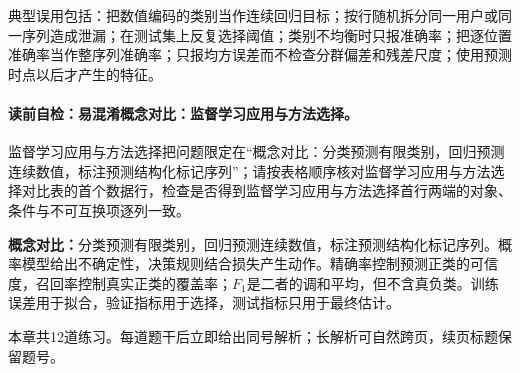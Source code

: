\begin{warningbox}
典型误用包括：把数值编码的类别当作连续回归目标；按行随机拆分同一用户或同一序列造成泄漏；在测试集上反复选择阈值；类别不均衡时只报准确率；把逐位置准确率当作整序列准确率；只报均方误差而不检查分群偏差和残差尺度；使用预测时点以后才产生的特征。
\end{warningbox}

\label{struct:V1-C11-CH31}
\paragraph{读前自检：易混淆概念对比：监督学习应用与方法选择。}监督学习应用与方法选择把问题限定在“概念对比：分类预测有限类别，回归预测连续数值，标注预测结构化标记序列”；请按表格顺序核对监督学习应用与方法选择对比表的首个数据行，检查是否得到监督学习应用与方法选择首行两端的对象、条件与不可互换项逐列一致。\par

\begin{comparisonbox}
\textbf{概念对比：}分类预测有限类别，回归预测连续数值，标注预测结构化标记序列。概率模型给出不确定性，决策规则结合损失产生动作。精确率控制预测正类的可信度，召回率控制真实正类的覆盖率；$F_1$是二者的调和平均，但不含真负类。训练误差用于拟合，验证指标用于选择，测试指标只用于最终估计。
\end{comparisonbox}
\begin{chapterexercisebox}
\label{struct:V1-C11-CH34}
\label{struct:V1-C11-CH35}
本章共12道练习。每道题干后立即给出同号解析；长解析可自然跨页，续页标题保留题号。
\end{chapterexercisebox}

